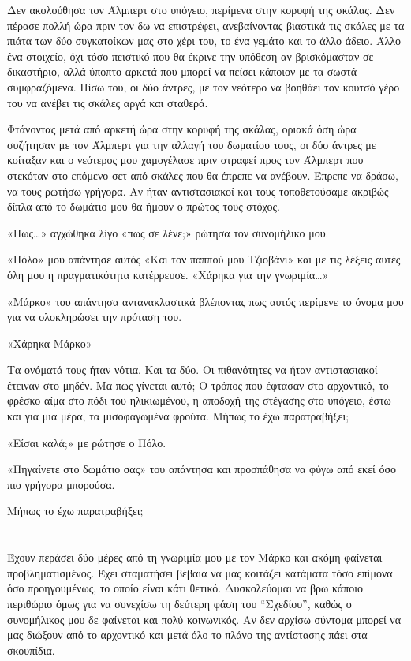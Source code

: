 \documentclass[12pt,twoside, openany]{book}
\begin{document}
Δεν ακολούθησα τον Άλμπερτ στο υπόγειο, περίμενα στην κορυφή της σκάλας. Δεν πέρασε πολλή ώρα πριν τον δω να επιστρέφει, ανεβαίνοντας βιαστικά τις σκάλες με τα πιάτα των δύο συγκατοίκων μας στο χέρι του, το ένα γεμάτο και το άλλο άδειο. Άλλο ένα στοιχείο, όχι τόσο πειστικό που θα έκρινε την υπόθεση αν βρισκόμασταν σε δικαστήριο, αλλά ύποπτο αρκετά που μπορεί να πείσει κάποιον με τα σωστά συμφραζόμενα. Πίσω του, οι δύο άντρες, με τον νεότερο να βοηθάει τον κουτσό γέρο του να ανέβει τις σκάλες αργά και σταθερά.

Φτάνοντας μετά από αρκετή ώρα στην κορυφή της σκάλας, οριακά όση ώρα συζήτησαν με τον Άλμπερτ για την αλλαγή του δωματίου τους, οι δύο άντρες με κοίταξαν και ο νεότερος μου χαμογέλασε πριν στραφεί προς τον Άλμπερτ που στεκόταν στο επόμενο σετ από σκάλες που θα έπρεπε να ανέβουν. Έπρεπε να δράσω, να τους ρωτήσω γρήγορα. Αν ήταν αντιστασιακοί και τους τοποθετούσαμε ακριβώς δίπλα από το δωμάτιο μου θα ήμουν ο πρώτος τους στόχος. 

«Πως…» αγχώθηκα λίγο «πως σε λένε;» ρώτησα τον συνομήλικο μου.

«Πόλο» μου απάντησε αυτός «Και τον παππού μου Τζιοβάνι» και με τις λέξεις αυτές όλη μου η πραγματικότητα κατέρρευσε. «Χάρηκα για την γνωριμία…»

«Μάρκο» του απάντησα αντανακλαστικά βλέποντας πως αυτός περίμενε το όνομα μου για να ολοκληρώσει την πρόταση του.

«Χάρηκα Μάρκο»

Τα ονόματά τους ήταν νότια. Και τα δύο. Οι πιθανότητες να ήταν αντιστασιακοί έτειναν στο μηδέν. Μα πως γίνεται αυτό; Ο τρόπος που έφτασαν στο αρχοντικό, το φρέσκο αίμα στο πόδι του ηλικιωμένου, η αποδοχή της στέγασης στο υπόγειο, έστω και για μια μέρα, τα μισοφαγωμένα φρούτα. Μήπως το έχω παρατραβήξει;

«Είσαι καλά;» με ρώτησε ο Πόλο.

«Πηγαίνετε στο δωμάτιο σας» του απάντησα και προσπάθησα να φύγω από εκεί όσο πιο γρήγορα μπορούσα.

Μήπως το έχω παρατραβήξει;


\chapter{}

Έχουν περάσει δύο μέρες από τη γνωριμία μου με τον Μάρκο και ακόμη φαίνεται προβληματισμένος. Έχει σταματήσει βέβαια να μας κοιτάζει κατάματα τόσο επίμονα όσο προηγουμένως, το οποίο είναι κάτι θετικό. Δυσκολεύομαι να βρω κάποιο περιθώριο όμως για να συνεχίσω τη δεύτερη φάση του “Σχεδίου”, καθώς ο συνομήλικος μου δε φαίνεται και πολύ κοινωνικός. Αν δεν αρχίσω σύντομα μπορεί να μας διώξουν από το αρχοντικό και μετά όλο το πλάνο της αντίστασης πάει στα σκουπίδια.
\end{document}
